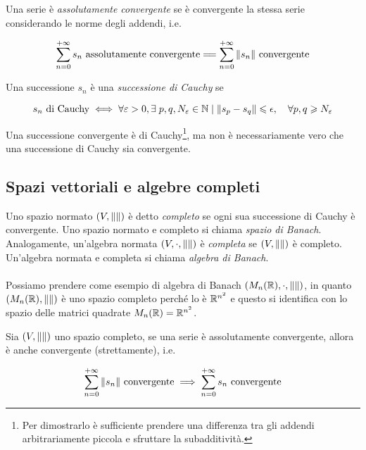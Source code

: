 Una serie è \textit{assolutamente convergente} se è convergente la stessa serie considerando le norme degli addendi, i.e.

\begin{equation}
	\sum_{n=0}^{+\infty} s_{n} \text{ assolutamente convergente} =\joinrel= \sum_{n=0}^{+\infty} \norm{s_{n}} \text{ convergente}
\end{equation}

Una successione $ s_{n} $ è una \textit{successione di Cauchy} se

\begin{equation}
	s_{n} \text{ di Cauchy} \iff \forall \varepsilon > 0, \E p,q,N_{\varepsilon} \in \N \mid \norm{s_{p} - s_{q}} \leqslant \epsilon \qcomma \forall p,q \geqslant N_{\varepsilon}
\end{equation}

\begin{remark}
	Una successione convergente è di Cauchy\footnote{%
		Per dimostrarlo è sufficiente prendere una differenza tra gli addendi arbitrariamente piccola e sfruttare la subadditività.%
	}, ma non è necessariamente vero che una successione di Cauchy sia convergente.
\end{remark}

\subsection{Spazi vettoriali e algebre completi}

Uno spazio normato $ (V,\norm{}) $ è detto \textit{completo} se ogni sua successione di Cauchy è convergente. Uno spazio normato e completo si chiama \textit{spazio di Banach}.\\
Analogamente, un'algebra normata $ (V,\cdot,\norm{}) $ è \textit{completa} se $ (V,\norm{}) $ è completo. Un'algebra normata e completa si chiama \textit{algebra di Banach}.\\\\
%
Possiamo prendere come esempio di algebra di Banach $ (M_{n}(\mathbb{R}),\cdot,\norm{}) $, in quanto $ (M_{n}(\mathbb{R}),\norm{}) $ è uno spazio completo perché lo è $ \mathbb{R}^{n^{2}} $ e questo si identifica con lo spazio delle matrici quadrate $ M_{n}(\mathbb{R}) = \mathbb{R}^{n^{2}} $.

\begin{definition}
	Sia $ (V,\norm{}) $ uno spazio completo, se una serie è assolutamente convergente, allora è anche convergente (strettamente), i.e.
	
	\begin{equation}
		\sum_{n=0}^{+\infty} \norm{s_{n}} \text{ convergente} \implies \sum_{n=0}^{+\infty} s_{n} \text{ convergente}
	\end{equation}
\end{definition}

